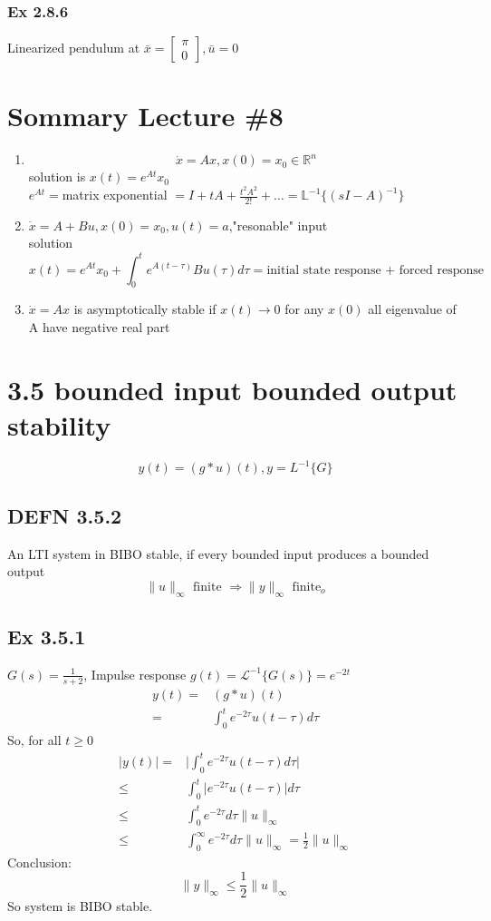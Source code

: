 \documentclass[letterpaper]{article}
\begin{document}
\subsubsection*{Ex 2.8.6} Linearized pendulum at $\bar x=\begin{bmatrix}\pi\\0\end{bmatrix},\bar u=0$

\section*{Sommary Lecture \#8}
\begin{enumerate}
	\item $$\dot x=Ax,x(0)=x_0\in\mathbb{R}^n$$
	      solution is $x(t)=e^{At}x_0$\\
	      $e^{At}=$matrix exponential $=I+tA+\frac{t^2A^2}{2!}+\hdots=\mathbb{L}^{-1}\{(sI-A)^{-1}\}$
	\item $\dot x=A+Bu,x(0)=x_0,u(t)=a$,"resonable" input\\
	      solution $$x(t)=e^{At}x_0+\int_0^t e^{A(t-\tau)}Bu(\tau)d\tau=\text{initial state response + forced response}$$
	\item $\dot x=Ax$ is asymptotically stable if $x(t)\rightarrow 0$ for any $x(0)$ all eigenvalue of A have negative real part
\end{enumerate}

\section*{3.5 bounded input bounded output stability}
$$y(t)=(g*u)(t),y=L^{-1}\{G\}$$
\subsection*{DEFN 3.5.2} An LTI system in BIBO stable, if every  bounded input produces a bounded output $$\|u\|_\infty \text{ finite }\Rightarrow \|y\|_\infty \text{ finite}_o$$
\subsection*{Ex 3.5.1}
$G(s)=\frac{1}{s+2}$, Impulse response $g(t)=\mathscr{L}^{-1}\{G(s)\}=e^{-2t}$
\begin{align*}
	y(t)= & (g*u)(t)                         \\
	=     & \int_0^te^{-2\tau}u(t-\tau)d\tau 
\end{align*}
So, for all $t\geq 0$
\begin{align*}
	|y(t)|= & \lvert \int_0^te^{-2\tau}u(t-\tau)d\tau\rvert                            \\
	\leq    & \int_0^t\lvert e^{-2\tau}u(t-\tau)\rvert d\tau                           \\
	\leq    & \int_0^te^{-2\tau}d\tau \|u\|_{\infty}                                   \\
	\leq    & \int_0^{\infty}e^{-2\tau}d\tau \|u\|_{\infty} =\frac{1}{2}\|u\|_{\infty} 
\end{align*}
Conclusion: $$\|y\|_{\infty}\leq \frac{1}{2}\|u\|_{\infty}$$
So system is BIBO stable.
\end{document}
